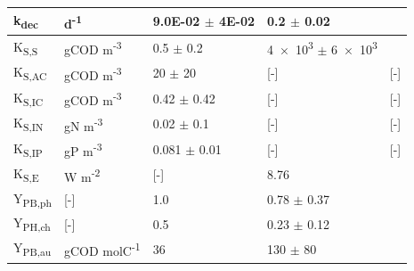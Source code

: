 \begin{table}[H]
\begin{tabular}{@{}p{2cm} p{3cm} p{4cm} p{4cm} p{3cm} @{}}
        k\textsubscript{dec} & d\textsuperscript{-1} & \num{9.0E-02} $\pm$ \num{4E-02}& \num{0.2} $\pm$ 0.02&  \cite{huangju-sheng1999, huang2001}\\
        \hline
        K\textsubscript{S,S} & gCOD m\textsuperscript{-3} & \num{0.5} $\pm$ \num{0.2} & \num{4e3} $\pm$ \num{6e3}& \cite{gadhamshetty2008,obeid2009}\\
        K\textsubscript{S,AC} & gCOD m\textsuperscript{-3} & \num{20} $\pm$ \num{20} & [-] &[-] \\
        K\textsubscript{S,IC} & gCOD m\textsuperscript{-3} & \num{.42} $\pm$  \num{.42} & [-] &[-] \\
        K\textsubscript{S,IN} & gN m\textsuperscript{-3} &\num{0.02} $\pm$ \num{0.1} & [-]&[-] \\
        K\textsubscript{S,IP} & gP m\textsuperscript{-3} &\num{0.081} $\pm$ \num{0.01} &[-] &[-] \\
        K\textsubscript{S,E} & W m\textsuperscript{-2} & [-] & \num{8.76} & \cite{eltsova2016} \\
        \hline
        Y\textsubscript{PB,ph} &[-] & 1.0 & \num{0.78} $\pm$ \num{0.37}& \cite{gadhamshetty2008, klamt2002, klein1991, mckinlay2011, obeid2009, schultz1982} \\
        Y\textsubscript{PH,ch} &[-] & \num{0.5} &\num{0.23} $\pm$ \num{0.12} &  \cite{madigan1978, schultz1982}\\
        Y\textsubscript{PB,au} &gCOD molC\textsuperscript{-1} &36 & 130 $\pm$ 80 & \cite{wang1993} \\
        \bottomrule
    \end{tabular}
    \label{tab:bioparams}
\end{table}




